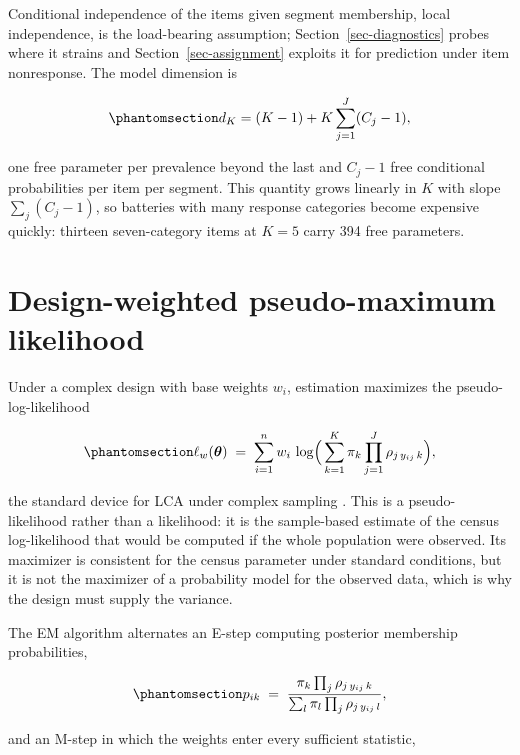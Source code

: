 \documentclass[
  12pt]{article}
\begin{document}
Conditional independence of the items given segment membership, local
independence, is the load-bearing assumption;
Section~\ref{sec-diagnostics} probes where it strains and
Section~\ref{sec-assignment} exploits it for prediction under item
nonresponse. The model dimension is

\begin{equation}\phantomsection\label{eq-df}{
d_K = (K - 1) + K \sum_{j=1}^{J} (C_j - 1),
}\end{equation}

one free parameter per prevalence beyond the last and \(C_j - 1\) free
conditional probabilities per item per segment. This quantity grows
linearly in \(K\) with slope \(\sum_j (C_j-1)\), so batteries with many
response categories become expensive quickly: thirteen seven-category
items at \(K = 5\) carry 394 free parameters.

\section{Design-weighted pseudo-maximum likelihood}\label{sec-pml}

Under a complex design with base weights \(w_i\), estimation maximizes
the pseudo-log-likelihood

\begin{equation}\phantomsection\label{eq-pll}{
\ell_w(\boldsymbol\theta) \;=\; \sum_{i=1}^{n} w_i \,
\log\!\Big( \sum_{k=1}^{K} \pi_k \prod_{j=1}^{J} \rho_{j\,y_{ij}\,k} \Big),
}\end{equation}

the standard device for LCA under complex sampling
\citep{patterson2002, vermunt2007, skinner1989}. This is a
pseudo-likelihood rather than a likelihood: it is the sample-based
estimate of the census log-likelihood that would be computed if the
whole population were observed. Its maximizer is consistent for the
census parameter under standard conditions, but it is not the maximizer
of a probability model for the observed data, which is why the design
must supply the variance.

The EM algorithm \citep{dempster1977} alternates an E-step computing
posterior membership probabilities,

\begin{equation}\phantomsection\label{eq-estep}{
p_{ik} \;=\; \frac{\pi_k \prod_j \rho_{j\,y_{ij}\,k}}
{\sum_{l} \pi_l \prod_j \rho_{j\,y_{ij}\,l}},
}\end{equation}

and an M-step in which the weights enter every sufficient statistic,
\end{document}
